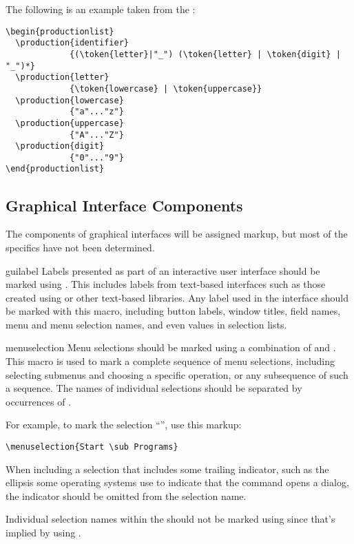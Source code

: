 \documentclass{howto}
\begin{document}
    The following is an example taken from the
    :

\begin{verbatim}
\begin{productionlist}
  \production{identifier}
             {(\token{letter}|"_") (\token{letter} | \token{digit} | "_")*}
  \production{letter}
             {\token{lowercase} | \token{uppercase}}
  \production{lowercase}
             {"a"..."z"}
  \production{uppercase}
             {"A"..."Z"}
  \production{digit}
             {"0"..."9"}
\end{productionlist}
\end{verbatim}


\subsection{Graphical Interface Components \label{gui-markup}}

  The components of graphical interfaces will be assigned markup, but
  most of the specifics have not been determined.

  \begin{macrodesc}{guilabel}{}
    Labels presented as part of an interactive user interface should
    be marked using .  This includes labels from
    text-based interfaces such as those created using  or
    other text-based libraries.  Any label used in the interface
    should be marked with this macro, including button labels, window
    titles, field names, menu and menu selection names, and even
    values in selection lists.
  \end{macrodesc}

  \begin{macrodesc}{menuselection}{}
    Menu selections should be marked using a combination of
     and .  This macro is used to mark
    a complete sequence of menu selections, including selecting
    submenus and choosing a specific operation, or any subsequence of
    such a sequence.  The names of individual selections should be
    separated by occurrences of .

    For example, to mark the selection ``'', use this markup:

\begin{verbatim}
\menuselection{Start \sub Programs}
\end{verbatim}

    When including a selection that includes some trailing indicator,
    such as the ellipsis some operating systems use to indicate that
    the command opens a dialog, the indicator should be omitted from
    the selection name.

    Individual selection names within the  should
    not be marked using  since that's implied by using
    .
  \end{macrodesc}
\end{document}
